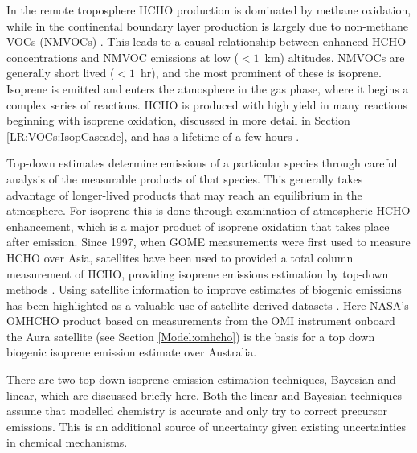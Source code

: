    In the remote troposphere HCHO production is dominated by methane oxidation, while in the continental boundary layer production is largely due to non-methane VOCs (NMVOCs) \parencite{Abbot2003, Kefauver2014}.
    This leads to a causal relationship between enhanced HCHO concentrations and NMVOC emissions at low ($<1$~km) altitudes.
    NMVOCs are generally short lived ($<1$~hr), and the most prominent of these is isoprene.
    Isoprene is emitted and enters the atmosphere in the gas phase, where it begins a complex series of reactions.
    HCHO is produced with high yield in many reactions beginning with isoprene oxidation, discussed in more detail in Section \ref{LR:VOCs:IsopCascade}, and has a lifetime of a few hours \parencite{Kefauver2014}.
    
    Top-down estimates determine emissions of a particular species through careful analysis of the measurable products of that species.
    This generally takes advantage of longer-lived products that may reach an equilibrium in the atmosphere.
    For isoprene this is done through examination of atmospheric HCHO enhancement, which is a major product of isoprene oxidation that takes place after emission.
    Since 1997, when GOME measurements were first used to measure HCHO over Asia, satellites have been used to provided a total column measurement of HCHO, providing isoprene emissions estimation by top-down methods \parencite{Thomas1998,Palmer2001,Bauwens2016}.
    Using satellite information to improve estimates of biogenic emissions has been highlighted as a valuable use of satellite derived datasets \parencite{Streets2013}.
    Here NASA's OMHCHO product based on measurements from the OMI instrument onboard the Aura satellite (see Section \ref{Model:omhcho}) is the basis for a top down biogenic isoprene emission estimate over Australia.
    
    There are two top-down isoprene emission estimation techniques, Bayesian and linear, which are discussed briefly here.
    Both the linear and Bayesian techniques assume that modelled chemistry is accurate and only try to correct precursor emissions.
    This is an additional source of uncertainty given existing uncertainties in chemical mechanisms.
    
